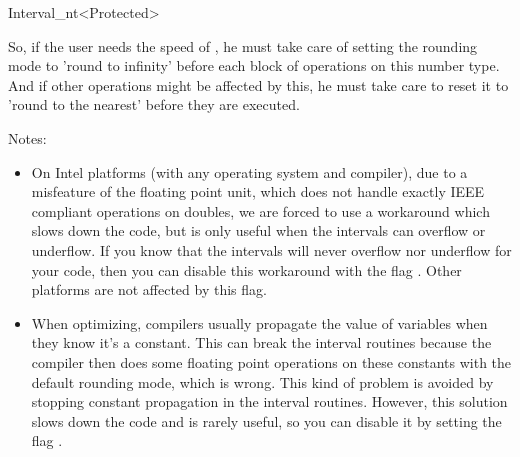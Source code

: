 \begin{ccRefClass}{Interval_nt<Protected>}
\begin{ccAdvanced}
So, if the user needs the speed of , he must
take care of setting the rounding mode to 'round to infinity' before each
block of operations on this number type.  And if other operations might be
affected by this, he must take care to reset it to 'round to the nearest'
before they are executed.


Notes:\\
\begin{itemize}
\item On Intel platforms (with any operating system and compiler), due to a
      misfeature of the floating point unit, which does not handle exactly
      IEEE compliant operations on doubles, we are forced to use a workaround
      which slows down the code, but is only useful when the intervals can
      overflow or underflow.  If you know that the intervals will never
      overflow nor underflow for your code, then you can disable this
      workaround with the flag .
      Other platforms are not affected by this flag.
\item When optimizing, compilers usually propagate the value of variables when
      they know it's a constant.  This can break the interval routines because
      the compiler then does some floating point operations on these constants
      with the default rounding mode, which is wrong.  This kind of problem
      is avoided by stopping constant propagation in the interval routines.
      However, this solution slows down the code and is rarely useful, so you
      can disable it by setting the flag
      .
\end{itemize}

\end{ccAdvanced}

\end{ccRefClass}
